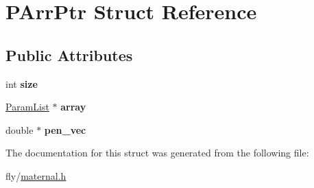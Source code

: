 \hypertarget{structPArrPtr}{
\section{PArrPtr Struct Reference}
\label{structPArrPtr}
}
\subsection*{Public Attributes}
\begin{DoxyCompactItemize}
\item 
\hypertarget{structPArrPtr_ae3578fb7c6aa7be123655fc80096f202}{
int {\bfseries size}}
\label{structPArrPtr_ae3578fb7c6aa7be123655fc80096f202}

\item 
\hypertarget{structPArrPtr_a8f084a2ae8c8c39fe3b53cdac3e78ea5}{
\hyperlink{structParamList}{ParamList} $\ast$ {\bfseries array}}
\label{structPArrPtr_a8f084a2ae8c8c39fe3b53cdac3e78ea5}

\item 
\hypertarget{structPArrPtr_a42c02d8d1943726afa722301d7828b9d}{
double $\ast$ {\bfseries pen\_\-vec}}
\label{structPArrPtr_a42c02d8d1943726afa722301d7828b9d}

\end{DoxyCompactItemize}


The documentation for this struct was generated from the following file:\begin{DoxyCompactItemize}
\item 
fly/\hyperlink{maternal_8h}{maternal.h}\end{DoxyCompactItemize}
